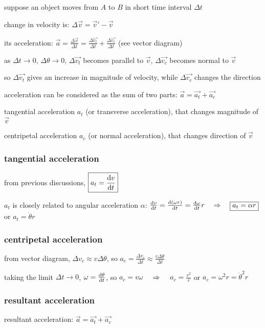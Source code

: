suppose an object moves from $A$ to $B$ in short time interval $\Delta t$

change in velocity is: $\Delta \vec{v} = \vec{v}' - \vec{v}$

its acceleration: $\vec{a} = \frac{\Delta \vec{v}}{\Delta t} = \frac{\Delta \vec{v_t}}{\Delta t} + \frac{\Delta \vec{v_c}}{\Delta t}$ (see vector diagram)

as $\Delta t \to 0$, $\Delta \theta \to 0$, $\Delta \vec{v_t}$ becomes parallel to $\vec{v}$, $\Delta \vec{v_c}$ becomes normal to $\vec{v}$

so $\Delta \vec{v_t}$ gives an increase in magnitude of velocity, while $\Delta \vec{v_c}$ changes the direction

acceleration can be considered as the sum of two parts: $\boxed{\vec{a} = \vec{a_t} + \vec{a_c}}$

tangential acceleration $a_t$ (or transverse acceleration), that changes magnitude of $\vec{v}$

centripetal acceleration $a_c$ (or normal acceleration), that changes direction of $\vec{v}$

\subsubsection*{tangential acceleration}

from previous discussions, $\boxed{a_t = \frac{\mathrm{d}v}{\mathrm{d}t}}$

$a_t$ is closely related to angular acceleration $\alpha$: $\frac{\mathrm{d}v}{\mathrm{d}t} = \frac{\mathrm{d}(\omega r)}{\mathrm{d}t} = \frac{\mathrm{d}\omega}{\mathrm{d}t} r \quad \Rightarrow \quad \boxed{a_t = \alpha r}$ or $\boxed{a_t = \ddot{\theta} r}$

\subsubsection*{centripetal acceleration}

from vector diagram, $\Delta v_c \approx v \Delta \theta$, so $a_c = \frac{\Delta v_c}{\Delta t} \approx \frac{v \Delta \theta}{\Delta t}$

taking the limit $\Delta t \to 0$, $\omega = \frac{\mathrm{d}\theta}{\mathrm{d}t}$, so $a_c = v\omega$ $\quad \Rightarrow \quad$ $\boxed{a_c = \frac{v^2}{r}}$ or $\boxed{ a_c = \omega^2 r  = \dot{\theta}^2 r}$

\subsubsection*{resultant acceleration}

resultant acceleration: $\vec{a} = \vec{a_t} + \vec{a_c}$

